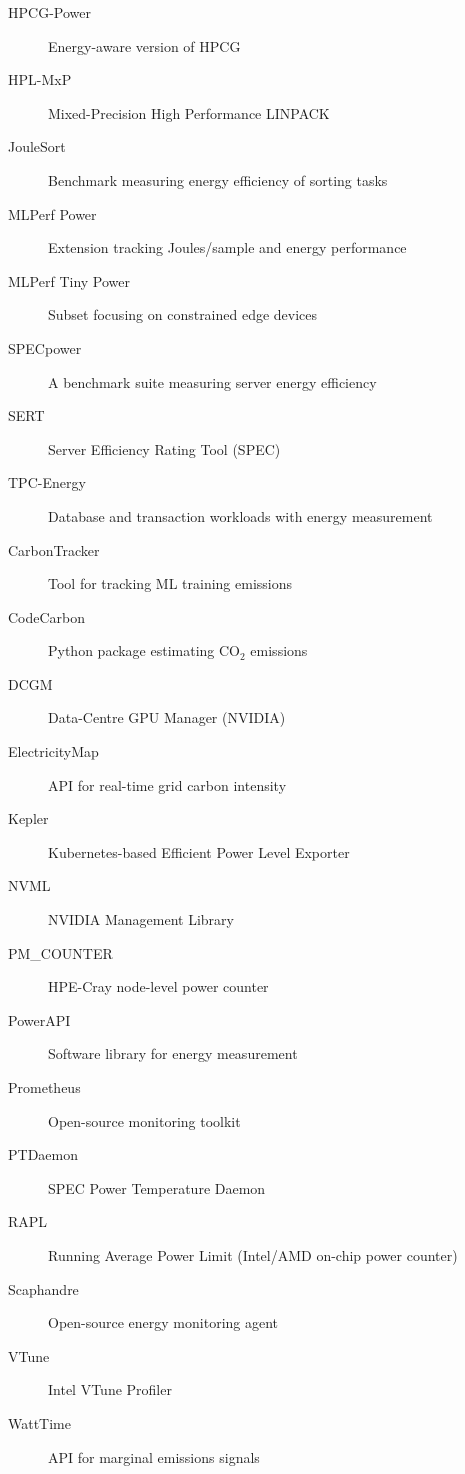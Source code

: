 \begin{description}
\item[HPCG-Power] Energy-aware version of HPCG
\item[HPL-MxP] Mixed-Precision High Performance LINPACK
\item[JouleSort] Benchmark measuring energy efficiency of sorting tasks
\item[MLPerf Power] Extension tracking Joules/sample and energy performance
\item[MLPerf Tiny Power] Subset focusing on constrained edge devices
\item[SPECpower] A benchmark suite measuring server energy efficiency
\item[SERT] Server Efficiency Rating Tool (SPEC)
\item[TPC-Energy] Database and transaction workloads with energy measurement
\end{description}


\begin{description}
\item[CarbonTracker] Tool for tracking ML training emissions
\item[CodeCarbon] Python package estimating CO$_2$ emissions
\item[DCGM] Data-Centre GPU Manager (NVIDIA)
\item[ElectricityMap] API for real-time grid carbon intensity
\item[Kepler] Kubernetes-based Efficient Power Level Exporter
\item[NVML] NVIDIA Management Library
\item[PM\_COUNTER] HPE-Cray node-level power counter
\item[PowerAPI] Software library for energy measurement
\item[Prometheus] Open-source monitoring toolkit
\item[PTDaemon] SPEC Power Temperature Daemon
\item[RAPL] Running Average Power Limit (Intel/AMD on-chip power counter)
\item[Scaphandre] Open-source energy monitoring agent
\item[VTune] Intel VTune Profiler
\item[WattTime] API for marginal emissions signals
\end{description}


